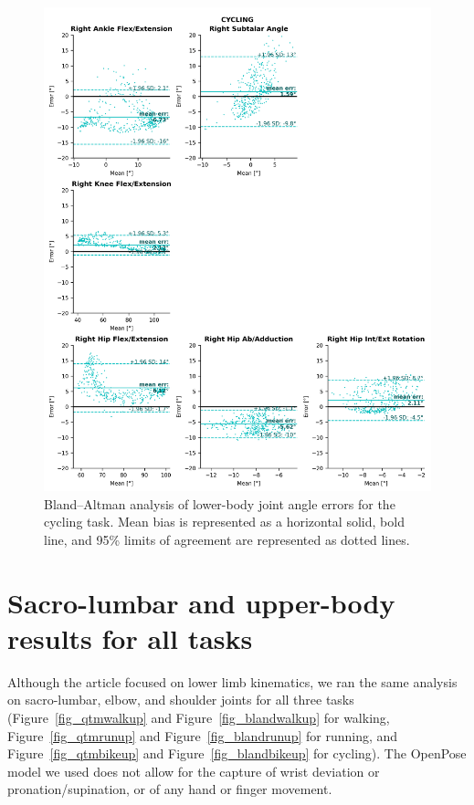 \begin{figure}[!ht]
	\centering
	\def\svgwidth{1\columnwidth}
	\fontsize{10pt}{10pt}\selectfont
	\includegraphics[height=\dimexpr\textheight-119pt]{"../Annexes/Figures/Fig_BlandBike.png"}
	\caption{Bland–Altman analysis of lower-body joint angle errors for the cycling task. Mean bias is represented as a horizontal solid, bold line, and 95\% limits of agreement are represented as dotted lines.}
	\label{fig_blandbike}
\end{figure}

\clearpage

\section{Sacro-lumbar and upper-body results for all tasks}\label{upper_acc}

Although the article focused on lower limb kinematics, we ran the same analysis on sacro-lumbar, elbow, and shoulder joints for all three tasks (Figure~\ref{fig_qtmwalkup} and Figure~\ref{fig_blandwalkup} for walking, Figure~\ref{fig_qtmrunup} and Figure~\ref{fig_blandrunup} for running, and Figure~\ref{fig_qtmbikeup} and Figure~\ref{fig_blandbikeup} for cycling). The OpenPose model we used does not allow for the capture of wrist deviation or pronation/supination, or of any hand or finger movement.

